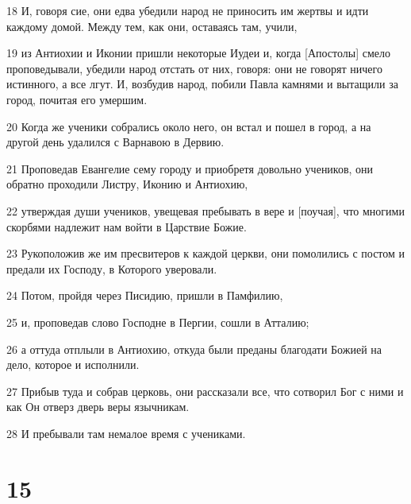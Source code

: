 \par 18 И, говоря сие, они едва убедили народ не приносить им жертвы и идти каждому домой. Между тем, как они, оставаясь там, учили,
\par 19 из Антиохии и Иконии пришли некоторые Иудеи и, когда [Апостолы] смело проповедывали, убедили народ отстать от них, говоря: они не говорят ничего истинного, а все лгут. И, возбудив народ, побили Павла камнями и вытащили за город, почитая его умершим.
\par 20 Когда же ученики собрались около него, он встал и пошел в город, а на другой день удалился с Варнавою в Дервию.
\par 21 Проповедав Евангелие сему городу и приобретя довольно учеников, они обратно проходили Листру, Иконию и Антиохию,
\par 22 утверждая души учеников, увещевая пребывать в вере и [поучая], что многими скорбями надлежит нам войти в Царствие Божие.
\par 23 Рукоположив же им пресвитеров к каждой церкви, они помолились с постом и предали их Господу, в Которого уверовали.
\par 24 Потом, пройдя через Писидию, пришли в Памфилию,
\par 25 и, проповедав слово Господне в Пергии, сошли в Атталию;
\par 26 а оттуда отплыли в Антиохию, откуда были преданы благодати Божией на дело, которое и исполнили.
\par 27 Прибыв туда и собрав церковь, они рассказали все, что сотворил Бог с ними и как Он отверз дверь веры язычникам.
\par 28 И пребывали там немалое время с учениками.

\chapter{15}


